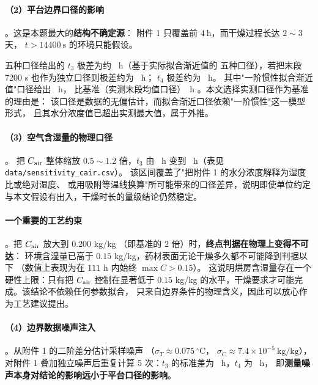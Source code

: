 \paragraph{（2）平台边界口径的影响}。这是本题最大的\textbf{结构不确定源}：
附件 1 只覆盖前 $4\ \mathrm{h}$，而干燥过程长达 $2\sim3$ 天，
$t>14400\ \mathrm{s}$ 的环境只能假设。



五种口径给出的 $t_3$ 极差为约 \ h（基于实际拟合渐近值的
五种口径），若把末段 7200 s 也作为独立口径则极差约为 \ h；
$t_4$ 极差约为 \ h。
其中"一阶惯性拟合渐近值"口径给出 \ h，
比基准（实测末段均值口径）\ h
。本文选择实测口径作为基准的理由是：
该口径是数据的无偏估计，而拟合渐近口径依赖"一阶惯性"这一模型形式，
且其水分浓度值已超出实测最大值，属于外推。

\paragraph{（3）空气含湿量的物理口径}。
把 $C_{\mathrm{air}}$ 整体缩放 $0.5\sim1.2$ 倍，$t_3$ 由 \ h
变到 \ h（表见 \texttt{data/sensitivity\_cair.csv}）。
该区间覆盖了"把附件 1 的水分浓度解释为湿度比或绝对湿度、
或用吸附等温线换算"所可能带来的口径差异，说明即使单位约定
与本文假设有出入，干燥时长的量级结论仍然稳定。

\paragraph{一个重要的工艺约束}。把 $C_{\mathrm{air}}$ 放大到 $0.200$ kg/kg
（即基准的 $2$ 倍）时，\textbf{终点判据在物理上变得不可达}：
环境含湿量已高于 $0.15$ kg/kg，药材表面无论干燥多久都不可能降到判据以下
（数值上表现为在 $111$ h 内始终 $\max C>0.15$）。
这说明烘房含湿量存在一个硬性上限：只有把 $C_{\mathrm{air}}$ 控制在显著低于
$0.15$ kg/kg 的水平，干燥要求才可能完成。该结论不依赖任何参数拟合，
只来自边界条件的物理含义，因此可以放心作为工艺建议提出。

\paragraph{（4）边界数据噪声注入}。从附件 1 的二阶差分估计采样噪声
（$\sigma_{T}\approx0.075\ ^\circ\mathrm{C}$，
$\sigma_{C}\approx7.4\times10^{-5}\ \mathrm{kg/kg}$），
对附件 1 叠加独立噪声后重复计算 5 次：$t_3$ 的标准差为
\ h，$t_4$ 为 \ h，
即\textbf{测量噪声本身对结论的影响远小于平台口径的影响}。

